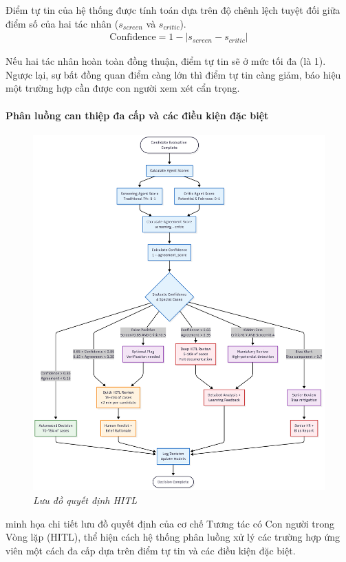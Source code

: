 \documentclass{article}
\begin{document}
\begin{itemize}[topsep=0pt, itemsep=4pt, leftmargin=40pt]
Điểm tự tin của hệ thống được tính toán dựa trên độ chênh lệch tuyệt đối giữa điểm số của hai tác nhân ($s_{screen}$ và $s_{critic}$).
\begin{gather*}
\text{Confidence} = 1 - |s_{screen}-s_{critic}|
\end{gather*}

Nếu hai tác nhân hoàn toàn đồng thuận, điểm tự tin sẽ ở mức tối đa (là 1). Ngược lại, sự bất đồng quan điểm càng lớn thì điểm tự tin càng giảm, báo hiệu một trường hợp cần được con người xem xét cẩn trọng.

\paragraph{Phân luồng can thiệp đa cấp và các điều kiện đặc biệt}
\begin{figure}[H]
    \centering
    \includegraphics[width=0.9\linewidth]{img/hitl-decision-flow.png}
    \caption{\textit{Lưu đồ quyết định HITL}}
    \label{fig:hitl-decision-flow}
\end{figure}

\hyperref[fig:hitl-decision-flow]{\color{blue}{Hình 4.4}} minh họa chi tiết lưu đồ quyết định của cơ chế Tương tác có Con người trong Vòng lặp (HITL), thể hiện cách hệ thống phân luồng xử lý các trường hợp ứng viên một cách đa cấp dựa trên điểm tự tin và các điều kiện đặc biệt.


\end{itemize}
\end{document}
